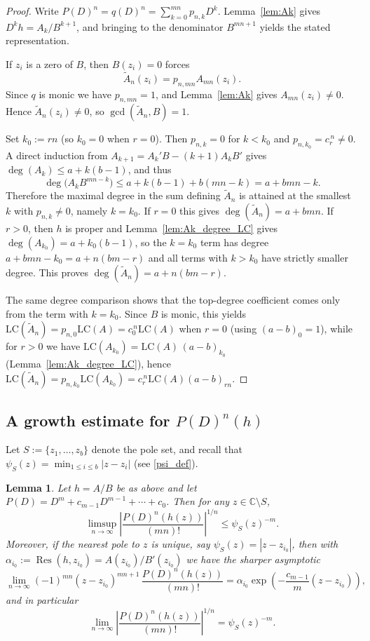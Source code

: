 \documentclass[12pt]{article}
\theoremstyle{plain}
\newtheorem{lemma}[theorem]{Lemma}
\theoremstyle{definition}
\begin{document}
\begin{proof}
Write $P(D)^n=q(D)^n=\sum_{k=0}^{mn}p_{n,k}D^k$.
Lemma~\ref{lem:Ak} gives $D^k h=A_k/B^{k+1}$, and bringing to the denominator $B^{mn+1}$ yields the stated representation.

If $z_i$ is a zero of $B$, then $B(z_i)=0$ forces
$$\widetilde A_n(z_i)=p_{n,mn}A_{mn}(z_i).$$
Since $q$ is monic we have $p_{n,mn}=1$, and Lemma~\ref{lem:Ak} gives $A_{mn}(z_i)\neq0$.
Hence $\widetilde A_n(z_i)\neq0$, so $\gcd(\widetilde A_n,B)=1$.

Set $k_0:=rn$ (so $k_0=0$ when $r=0$). Then $p_{n,k}=0$ for $k<k_0$ and $p_{n,k_0}=c_r^{\,n}\neq0$.
A direct induction from $A_{k+1}=A_k'B-(k+1)A_kB'$ gives $\deg(A_k)\le a+k(b-1)$, and thus
$$\deg\bigl(A_kB^{mn-k}\bigr)\le a+k(b-1)+b(mn-k)=a+bmn-k.$$
Therefore the maximal degree in the sum defining $\widetilde A_n$ is attained at the smallest $k$ with $p_{n,k}\neq0$, namely $k=k_0$.
If $r=0$ this gives $\deg(\widetilde A_n)=a+bmn$.
If $r>0$, then $h$ is proper and Lemma~\ref{lem:Ak_degree_LC} gives $\deg(A_{k_0})=a+k_0(b-1)$, so the $k=k_0$ term has degree $a+bmn-k_0=a+n(bm-r)$ and all terms with $k>k_0$ have strictly smaller degree.
This proves $\deg(\widetilde A_n)=a+n(bm-r)$.

The same degree comparison shows that the top-degree coefficient comes only from the term with $k=k_0$.
Since $B$ is monic, this yields $\mathrm{LC}(\widetilde A_n)=p_{n,0}\mathrm{LC}(A)=c_0^{\,n}\mathrm{LC}(A)$ when $r=0$ (using $(a-b)_0=1$), while for $r>0$ we have $\mathrm{LC}(A_{k_0})=\mathrm{LC}(A)\,(a-b)_{k_0}$ (Lemma~\ref{lem:Ak_degree_LC}), hence
$\mathrm{LC}(\widetilde A_n)=p_{n,k_0}\mathrm{LC}(A_{k_0})=c_r^{\,n}\mathrm{LC}(A)(a-b)_{rn}$.
\end{proof}

\subsection{A growth estimate for $P(D)^n(h)$}

Let $S:=\{z_1,\dots,z_b\}$ denote the pole set, and recall that $\psi_S(z)=\min_{1\le i\le b}|z-z_i|$ (see \eqref{psi_def}).

\begin{lemma}\label{lem_growth_m}
Let $h=A/B$ be as above and let $P(D)=D^m+c_{m-1}D^{m-1}+\cdots+c_0$.
Then for any $z\in\mathbb C\setminus S$,
$$\limsup_{n\to\infty}\left|\frac{P(D)^n\!\left(h(z)\right)}{(mn)!}\right|^{1/n}\le \psi_S(z)^{-m}.$$
Moreover, if the nearest pole to $z$ is unique, say $\psi_S(z)=|z-z_{i_0}|$, then with $\alpha_{i_0}:=\operatorname{Res}(h,z_{i_0})=A(z_{i_0})/B'(z_{i_0})$ we have the sharper asymptotic
$$\lim_{n\to\infty}(-1)^{mn}(z-z_{i_0})^{mn+1}\,\frac{P(D)^n\!\left(h(z)\right)}{(mn)!}
=\alpha_{i_0}\exp\!\left(-\frac{c_{m-1}}{m}(z-z_{i_0})\right),$$
and in particular
$$\lim_{n\to\infty}\left|\frac{P(D)^n\!\left(h(z)\right)}{(mn)!}\right|^{1/n}= \psi_S(z)^{-m}.$$
\end{lemma}
\end{document}
